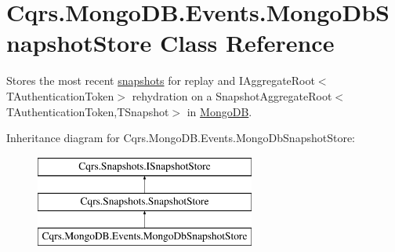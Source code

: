 \hypertarget{classCqrs_1_1MongoDB_1_1Events_1_1MongoDbSnapshotStore}{}\section{Cqrs.\+Mongo\+D\+B.\+Events.\+Mongo\+Db\+Snapshot\+Store Class Reference}
\label{classCqrs_1_1MongoDB_1_1Events_1_1MongoDbSnapshotStore}


Stores the most recent \hyperlink{}{snapshots} for replay and I\+Aggregate\+Root$<$\+T\+Authentication\+Token$>$ rehydration on a Snapshot\+Aggregate\+Root$<$\+T\+Authentication\+Token,\+T\+Snapshot$>$ in \hyperlink{namespaceCqrs_1_1MongoDB}{Mongo\+DB}.  


Inheritance diagram for Cqrs.\+Mongo\+D\+B.\+Events.\+Mongo\+Db\+Snapshot\+Store\+:\begin{figure}[H]
\begin{center}
\leavevmode
\includegraphics[height=3.000000cm]{classCqrs_1_1MongoDB_1_1Events_1_1MongoDbSnapshotStore}
\end{center}
\end{figure}
